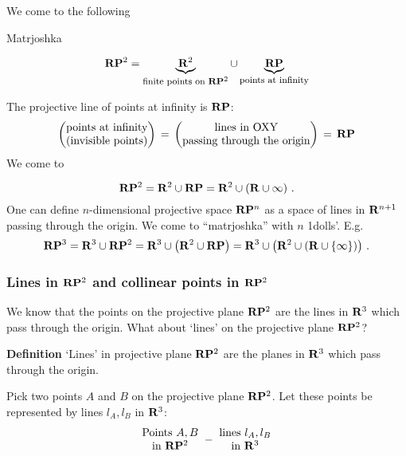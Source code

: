 \documentclass[12pt]{article}
\numberwithin{equation}{section}
\begin{document}
  We come to the following
 
\bigskip 
         
 \centerline   { {\LARGE  Matrjoshka}}
        \begin{equation}
        {\bf R}{\bf P}^2=\underbrace{{\bf R}^2}_
{\hbox{\footnotesize finite points on ${\bf R}{\bf P}^2$} }\cup 
        \underbrace{{\bf R}{\bf P}}_
{\hbox{\footnotesize points at infinity} } 
        \end{equation}

The projective line of points at infinity is ${\bf R}{\bf P}$:
              \begin{equation*}
          \begin{pmatrix}
        \hbox{points at infinity}\cr 
        \hbox{(invisible points)}\cr 
              \end{pmatrix}                   
                    \,=\,  
          \begin{pmatrix}
        \hbox{lines in OXY}\cr 
        \hbox{passing through the origin}\cr
          \end{pmatrix}
                \,=\, {\bf R}{\bf P} 
              \end{equation*}
We come to  

        \begin{equation}
      {\bf R}{\bf P}^2=  {\bf R}^2\cup{\bf R}{\bf P}={\bf R}^2\cup\left({\bf R}\cup {\infty}\right)\,.
        \end{equation}
{\footnotesize One can define $n$-dimensional projective space ${\bf R}{\bf P}^n$
as a space of lines in ${\bf R}^{n+1}$ passing through the origin. We come
to ``matrjoshka'' with $n$ 1dolls'. E.g.
                    $$
{\bf R}{\bf P}^3=
{\bf R}^3\cup {\bf R}{\bf P}^2=
{\bf R}^3\cup \left({\bf R}^2\cup {\bf R}{\bf P}\right)=
{\bf R}^3\cup \left({\bf R}^2\cup \left({\bf R}\cup \{\infty\}\right)\right)\,.
                    $$
}
                 
      
 \subsubsection {Lines in ${\bf R}{\bf P}^2$ and 
collinear points in ${\bf R}{\bf P}^2$}

We know that the points on the projective plane ${\bf R}{\bf P}^2$ are 
the lines in ${\bf R}^3$
which pass through the origin.
What about `lines' on the projective plane ${\bf R}{\bf P}^2$? 

{\bf Definition}  `Lines' in projective plane ${\bf R}{\bf P}^2$
are the planes in ${\bf R}^3$ which pass through the origin. 

\smallskip



Pick two  points $A$ and $B$ on the projective plane ${\bf R}{\bf P}^2$.
Let these points be represented by lines $l_A,l_B$ in ${\bf R}^3$:
   \begin{equation*}
                  \begin{matrix}
 \hbox {Points $A,B$}\cr
 \hbox{in ${\bf R}{\bf P}^2$}\cr
                     \end{matrix}
               \,\, -\,\,
                   \begin{matrix}
 \hbox {lines $l_A,l_B$}\cr
 \hbox{in ${\bf R}^3$}\cr
                     \end{matrix}
               \end{equation*}
\end{document}
